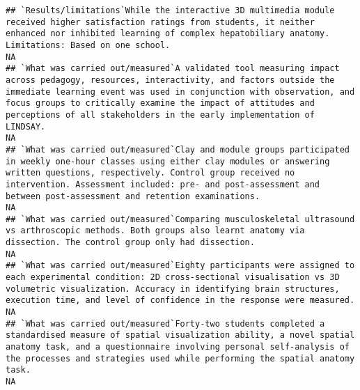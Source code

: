 \documentclass[]{article}
\begin{document}
\begin{verbatim}
## `Results/limitations`While the interactive 3D multimedia module received higher satisfaction ratings from students, it neither enhanced nor inhibited learning of complex hepatobiliary anatomy. Limitations: Based on one school.                                                                                                                                                                                                                                                    NA
## `What was carried out/measured`A validated tool measuring impact across pedagogy, resources, interactivity, and factors outside the immediate learning event was used in conjunction with observation, and focus groups to critically examine the impact of attitudes and perceptions of all stakeholders in the early implementation of LINDSAY.                                                                                                                                     NA
## `What was carried out/measured`Clay and module groups participated in weekly one-hour classes using either clay modules or answering written questions, respectively. Control group received no intervention. Assessment included: pre- and post-assessment and between post-assessment and retention examinations.                                                                                                                                                                   NA
## `What was carried out/measured`Comparing musculoskeletal ultrasound vs arthroscopic methods. Both groups also learnt anatomy via dissection. The control group only had dissection.                                                                                                                                                                                                                                                                                                   NA
## `What was carried out/measured`Eighty participants were assigned to each experimental condition: 2D cross-sectional visualisation vs 3D volumetric visualization. Accuracy in identifying brain structures, execution time, and level of confidence in the response were measured.                                                                                                                                                                                                    NA
## `What was carried out/measured`Forty-two students completed a standardised measure of spatial visualization ability, a novel spatial anatomy task, and a questionnaire involving personal self-analysis of the processes and strategies used while performing the spatial anatomy task.                                                                                                                                                                                               NA

\end{verbatim}
\end{document}
